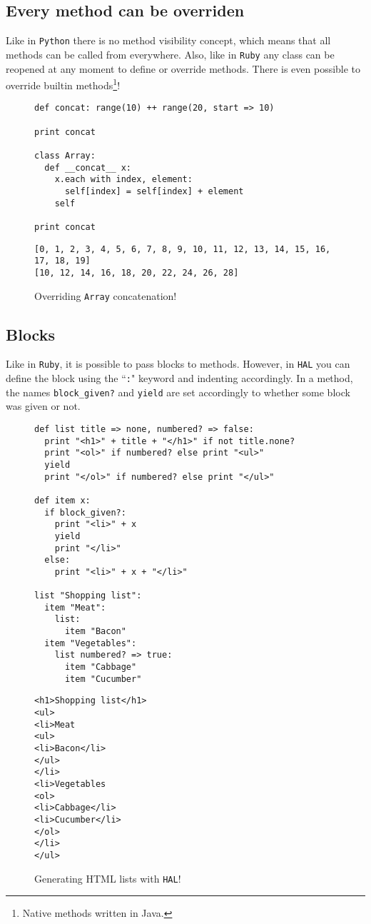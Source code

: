 \documentclass[a4paper,11pt]{article}
\begin{document}
\subsection{Every method can be overriden}
Like in \texttt{Python} there is no method visibility
  concept, which means that all methods can be called from everywhere. Also, like in \texttt{Ruby}
  any class can be reopened at any moment to define or override methods. There is even possible to
  override builtin methods\footnote{Native methods written in Java.}!
\begin{figure}[h!]
\begin{lstlisting}[language=hal]
def concat: range(10) ++ range(20, start => 10)

print concat

class Array:
  def __concat__ x:
    x.each with index, element:
      self[index] = self[index] + element
    self

print concat
\end{lstlisting}
\begin{lstlisting}[language=output]
[0, 1, 2, 3, 4, 5, 6, 7, 8, 9, 10, 11, 12, 13, 14, 15, 16, 17, 18, 19]
[10, 12, 14, 16, 18, 20, 22, 24, 26, 28]
\end{lstlisting}
\caption{Overriding \texttt{Array} concatenation!}
\label{overrides}
\end{figure}
\clearpage
\subsection{Blocks}
Like in \texttt{Ruby}, it is possible to pass blocks to methods. However, in \texttt{HAL} you can define the
  block using the ``\texttt{:}" keyword and indenting accordingly. In a method, the names \texttt{block\_given?}
  and \texttt{yield} are set accordingly to whether some block was given or not.
\begin{figure}[h!]
\begin{lstlisting}[language=hal]
def list title => none, numbered? => false:
  print "<h1>" + title + "</h1>" if not title.none?
  print "<ol>" if numbered? else print "<ul>"
  yield
  print "</ol>" if numbered? else print "</ul>"

def item x:
  if block_given?:
  	print "<li>" + x
  	yield
  	print "</li>"
  else:
    print "<li>" + x + "</li>"

list "Shopping list":
  item "Meat":
    list:
      item "Bacon"
  item "Vegetables":
    list numbered? => true:
      item "Cabbage"
      item "Cucumber"
\end{lstlisting}
\begin{lstlisting}[language=output]
<h1>Shopping list</h1>
<ul>
<li>Meat
<ul>
<li>Bacon</li>
</ul>
</li>
<li>Vegetables
<ol>
<li>Cabbage</li>
<li>Cucumber</li>
</ol>
</li>
</ul>
\end{lstlisting}
\caption{Generating HTML lists with \texttt{HAL}!}
\label{blocks}
\end{figure}
\end{document}
